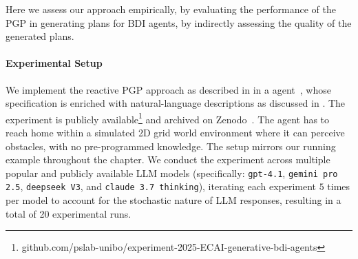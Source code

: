 Here we assess our approach empirically,
by evaluating the performance of the \ac{PGP} in generating plans for \ac{BDI} agents,
by indirectly assessing the quality of the generated plans.

\paragraph{Experimental Setup}

We implement the reactive \ac{PGP} approach as described in  in a \jakta{} agent~\cite{DBLP:journals/sncs/BaiardiBCP24},
whose specification is enriched with natural-language descriptions as discussed in .
%
The experiment is publicly available\footnote{github.com/pslab-unibo/experiment-2025-ECAI-generative-bdi-agents} 
and archived on Zenodo~\cite{ZenodoArtifact}.
%
The agent has to reach home within a simulated 2D grid world environment
where it can perceive obstacles, with no pre-programmed knowledge.
%
The setup mirrors our running example throughout the chapter.
%
We conduct the experiment across multiple popular and publicly available LLM models
(specifically: \texttt{gpt-4.1}, \texttt{gemini pro 2.5}, \texttt{deepseek V3}, and \texttt{claude 3.7 thinking}),
iterating each experiment $5$ times per model
to account for the stochastic nature of LLM responses,
resulting in a total of 20 experimental runs.

